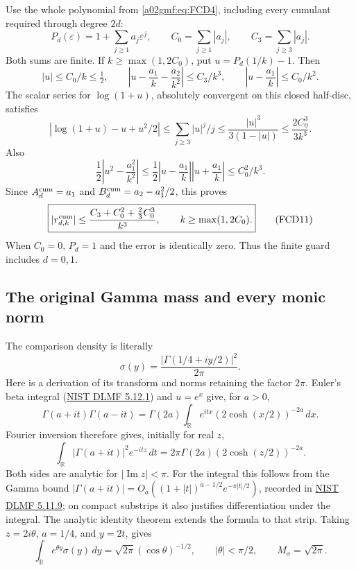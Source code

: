 Use the whole polynomial from \eqref{a02gmf:eq:FCD4}, including every
cumulant required through degree \(2d\):
\[
 P_d(\varepsilon)=1+\sum_{j\ge1}a_j\varepsilon^j,\qquad
 C_0=\sum_{j\ge1}|a_j|,\qquad C_3=\sum_{j\ge3}|a_j|.
\]
Both sums are finite. If \(k\ge\max(1,2C_0)\), put
\(u=P_d(1/k)-1\). Then
\[
 |u|\le C_0/k\le\tfrac12,\qquad
 \left|u-\frac{a_1}k-\frac{a_2}{k^2}\right|
       \le C_3/k^3,\qquad
 \left|u-\frac{a_1}k\right|\le C_0/k^2 .
\]
The scalar series for \(\log(1+u)\), absolutely convergent on this
closed half-disc, satisfies
\[
 |\log(1+u)-u+u^2/2|
   \le\sum_{j\ge3}|u|^j/j
   \le\frac{|u|^3}{3(1-|u|)}
   \le\frac{2C_0^3}{3k^3}.
\]
Also
\[
 \frac12\left|u^2-\frac{a_1^2}{k^2}\right|
 \le\frac12\left|u-\frac{a_1}k\right|
                  \left|u+\frac{a_1}k\right|
 \le C_0^2/k^3 .
\]
Since \(A_d^{\rm cum}=a_1\) and
\(B_d^{\rm cum}=a_2-a_1^2/2\), this proves
\begin{equation}
 \boxed{\displaystyle
 |r_{d,k}^{\rm cum}|
 \le \frac{C_3+C_0^2+\tfrac23 C_0^3}{k^3},
 \qquad k\ge\max(1,2C_0).}
 \tag{FCD11}\label{a02gmf:eq:FCD11}
\end{equation}
When \(C_0=0\), \(P_d=1\) and the error is identically zero.
Thus the finite guard includes \(d=0,1\).

\subsection{The original Gamma mass and every monic norm}

The comparison density is literally
\[
 \sigma(y)=\frac{|\Gamma(1/4+iy/2)|^2}{2\pi}.
\]
Here is a derivation of its transform and norms retaining the factor
\(2\pi\). Euler's beta integral
(\href{https://dlmf.nist.gov/5.12.E1}{NIST DLMF 5.12.1})
and \(u=e^x\) give, for \(a>0\),
\[
 \Gamma(a+it)\Gamma(a-it)
   =\Gamma(2a)\int_{\mathbb R}
           e^{itx}(2\cosh(x/2))^{-2a}\,dx.
\]
Fourier inversion therefore gives, initially for real \(z\),
\[
 \int_{\mathbb R}|\Gamma(a+it)|^2e^{-itz}\,dt
        =2\pi\Gamma(2a)(2\cosh(z/2))^{-2a}.
\]
Both sides are analytic for \(|\operatorname{Im}z|<\pi\).
For the integral this follows from the Gamma bound
\(|\Gamma(a+it)|=O_a((1+|t|)^{a-1/2}e^{-\pi|t|/2})\),
recorded in
\href{https://dlmf.nist.gov/5.11.E9}{NIST DLMF 5.11.9};
on compact substrips it also justifies differentiation under the integral.
The analytic identity theorem extends the formula to that strip.
Taking \(z=2i\theta\), \(a=1/4\), and \(y=2t\), gives
\begin{equation}
 \int_{\mathbb R}e^{\theta y}\sigma(y)\,dy
       =\sqrt{2\pi}(\cos\theta)^{-1/2},\qquad
 |\theta|<\pi/2,\qquad M_\sigma=\sqrt{2\pi}.
 \tag{FCD12}\label{a02gmf:eq:FCD12}
\end{equation}

